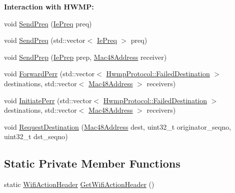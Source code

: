 \begin{Indent}{\bf Interaction with H\+W\+MP\+:}\par
\begin{DoxyCompactItemize}
\item 
void \hyperlink{classns3_1_1dot11s_1_1HwmpProtocolMac_a21265cdf136b02d2974034c2ba9b8d4f}{Send\+Preq} (\hyperlink{classns3_1_1dot11s_1_1IePreq}{Ie\+Preq} preq)
\item 
void \hyperlink{classns3_1_1dot11s_1_1HwmpProtocolMac_a1e2022e63e558dcc92eee7a10670a45a}{Send\+Preq} (std\+::vector$<$ \hyperlink{classns3_1_1dot11s_1_1IePreq}{Ie\+Preq} $>$ preq)
\item 
void \hyperlink{classns3_1_1dot11s_1_1HwmpProtocolMac_a3269786a620f3f0d8943efe2f1a177c2}{Send\+Prep} (\hyperlink{classns3_1_1dot11s_1_1IePrep}{Ie\+Prep} prep, \hyperlink{classns3_1_1Mac48Address}{Mac48\+Address} receiver)
\item 
void \hyperlink{classns3_1_1dot11s_1_1HwmpProtocolMac_a5c927889164314cde5cf7c23cae3e7e3}{Forward\+Perr} (std\+::vector$<$ \hyperlink{structns3_1_1dot11s_1_1HwmpProtocol_1_1FailedDestination}{Hwmp\+Protocol\+::\+Failed\+Destination} $>$ destinations, std\+::vector$<$ \hyperlink{classns3_1_1Mac48Address}{Mac48\+Address} $>$ receivers)
\item 
void \hyperlink{classns3_1_1dot11s_1_1HwmpProtocolMac_a9dd1ec4479ae4899c05d18dc7d4dd8b7}{Initiate\+Perr} (std\+::vector$<$ \hyperlink{structns3_1_1dot11s_1_1HwmpProtocol_1_1FailedDestination}{Hwmp\+Protocol\+::\+Failed\+Destination} $>$ destinations, std\+::vector$<$ \hyperlink{classns3_1_1Mac48Address}{Mac48\+Address} $>$ receivers)
\item 
void \hyperlink{classns3_1_1dot11s_1_1HwmpProtocolMac_af76aa30e2860d6b655f8db5e4408908b}{Request\+Destination} (\hyperlink{classns3_1_1Mac48Address}{Mac48\+Address} dest, uint32\+\_\+t originator\+\_\+seqno, uint32\+\_\+t dst\+\_\+seqno)
\end{DoxyCompactItemize}
\end{Indent}
\subsection*{Static Private Member Functions}
\begin{DoxyCompactItemize}
\item 
static \hyperlink{classns3_1_1WifiActionHeader}{Wifi\+Action\+Header} \hyperlink{classns3_1_1dot11s_1_1HwmpProtocolMac_a0f40598c892522fe335b6b4d2190738f}{Get\+Wifi\+Action\+Header} ()
\end{DoxyCompactItemize}
